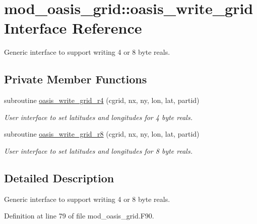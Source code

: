 \hypertarget{interfacemod__oasis__grid_1_1oasis__write__grid}{\section{mod\+\_\+oasis\+\_\+grid\+:\+:oasis\+\_\+write\+\_\+grid Interface Reference}
\label{interfacemod__oasis__grid_1_1oasis__write__grid}
}


Generic interface to support writing 4 or 8 byte reals.  


\subsection*{Private Member Functions}
\begin{DoxyCompactItemize}
\item 
subroutine \hyperlink{interfacemod__oasis__grid_1_1oasis__write__grid_a7eede475150c0fa6692193c940d4268b}{oasis\+\_\+write\+\_\+grid\+\_\+r4} (cgrid, nx, ny, lon, lat, partid)
\begin{DoxyCompactList}\small\item\em User interface to set latitudes and longitudes for 4 byte reals. \end{DoxyCompactList}\item 
subroutine \hyperlink{interfacemod__oasis__grid_1_1oasis__write__grid_a31dbc6c9b5268a261b61a005762ffb28}{oasis\+\_\+write\+\_\+grid\+\_\+r8} (cgrid, nx, ny, lon, lat, partid)
\begin{DoxyCompactList}\small\item\em User interface to set latitudes and longitudes for 8 byte reals. \end{DoxyCompactList}\end{DoxyCompactItemize}


\subsection{Detailed Description}
Generic interface to support writing 4 or 8 byte reals. 

Definition at line 79 of file mod\+\_\+oasis\+\_\+grid.\+F90.



